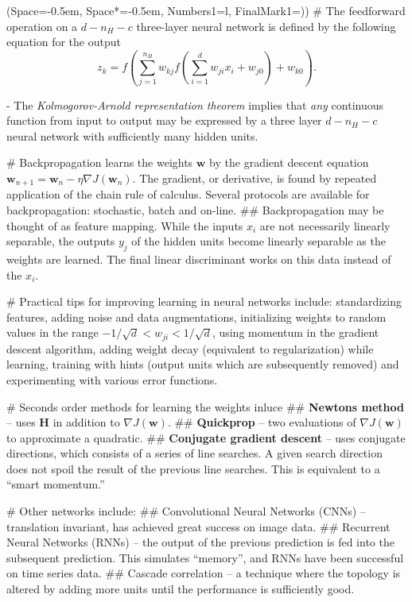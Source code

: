\documentclass[12pt, a4paper]{article}
\newcommand{\listSpace}{-0.5em}%
\newcommand{\vect}[1]{\bm{#1}}
\begin{document}
\begin{easylist}[itemize]
\ListProperties(Space=\listSpace, Space*=\listSpace, Numbers1=l, FinalMark1={)})
# The feedforward operation on a $d - n_H -c$ three-layer neural network is defined by the following equation for the output
\begin{equation*}
	z_k = f \left( \sum_{j=1}^{n_H} w_{kj} f \left( \sum_{i=1}^{d} w_{ji} x_i + w_{j0} \right) + w_{k0} \right).
\end{equation*}

- The \emph{Kolmogorov-Arnold representation theorem} implies that \emph{any} continuous function from input to output may be expressed by a three layer $d - n_H - c$ neural network with sufficiently many hidden units.

# Backpropagation learns the weights $\vect{w}$ by the gradient descent equation $\vect{w}_{n+1} = \vect{w}_{n} - \eta \nabla J(\vect{w}_{n})$. 
The gradient, or derivative, is found by repeated application of the chain rule of calculus.
Several protocols are available for backpropagation: stochastic, batch and on-line.
## Backpropagation may be thought of as feature mapping.
While the inputs $x_i$ are not necessarily linearly separable, the outputs $y_j$ of the hidden units become linearly separable as the weights are learned.
The final linear discriminant works on this data instead of the $x_i$.

# Practical tips for improving learning in neural networks include:
standardizing features, 
adding noise and data augmentations, 
initializing weights to random values in the range $-1 / \sqrt{d} < w_{ji} < 1 / \sqrt{d}$, 
using momentum in the gradient descent algorithm, 
adding weight decay (equivalent to regularization) while learning, 
training with hints (output units which are subsequently removed) and 
experimenting with various error functions.

# Seconds order methods for learning the weights inluce
## \textbf{Newtons method} -- uses $\vect{H}$ in addition to $\nabla J(\vect{w})$.
## \textbf{Quickprop} -- two evaluations of $\nabla J(\vect{w})$ to approximate a quadratic.
## \textbf{Conjugate gradient descent} -- uses conjugate directions, which consists of a series of line searches. 
A given search direction does not spoil the result of the previous line searches.
This is equivalent to a ``smart momentum.''

# Other networks include:
## Convolutional Neural Networks (CNNs) -- translation invariant, has achieved great success on image data.
## Recurrent Neural Networks (RNNs) -- the output of the previous prediction is fed into the subsequent prediction. 
This simulates ``memory'', and RNNs have been successful on time series data.
## Cascade correlation -- a technique where the topology is altered by adding more units until the performance is sufficiently good.
\end{easylist}
\end{document}
